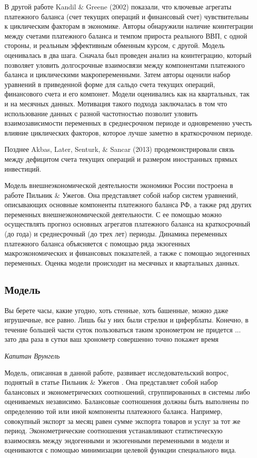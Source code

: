 \documentclass[a4paper, 14pt]{extarticle}
\begin{document}
В другой работе Kandil $\&$ Greene (2002) \autocite{kandil2002impact} показали, что ключевые агрегаты платежного баланса (счет текущих операций и финансовый счет) чувствительны к циклическим факторам в экономике. 
Авторы обнаружили наличие коинтеграции между счетами платежного баланса и темпом прироста реального ВВП, с одной стороны, и реальным эффективным обменным курсом, с другой. Модель оценивалась в два шага. 
Сначала был проведен анализ на коинтеграцию, который позволяет уловить долгосрочные взаимосвязи между компонентами платежного баланса и циклическими макропеременными. 
Затем авторы оценили набор уравнений в приведенной форме для сальдо счета текущих операций, финансового счета и его компонет. 
Модели оценивались как на квартальных, так и на месячных данных. 
Мотивация такого подхода заключалась в том что использование данных с разной частотностью позволит уловить взаимозависимости переменных в среднесрочном периоде и одновременно учесть влияние циклических факторов, которое лучше заметно в краткосрочном периоде.

Позднее Akbas, Later, Senturk, $\&$ Sancar  (2013) \autocite{akbas2013testing} продемонстрировали
 связь между дефицитом счета текущих операций и размером иностранных прямых инвестиций.

Модель внешнеэкономической деятельности экономики России построена в работе Пильник $\&$ Ужегов.
Она представляет собой набор систем уравнений, описывающих основные компоненты платежного баланса РФ, а также ряд других переменных внешнеэкономической деятельности.
С ее помощью можно осуществлять прогноз основных агрегатов платежного баланса на краткосрочный (до года) и среднесрочный (до трех лет) периоды.
Динамика переменных платежного баланса объясняется с помощью ряда экзогенных макроэкономических и финансовых показателей, а также с помощью эндогенных переменных. 
Оценка модели происходит на месячных и квартальных данных.


\newpage
\subsection{Модель}
\epigraph{Вы берете часы, какие угодно, хоть стенные, хоть башенные, можно даже игрушечные, все равно. Лишь бы у них были стрелки и циферблаты. Конечно, в течение большей части суток пользоваться таким хронометром не придется ... зато два раза в сутки ваш хронометр совершенно точно покажет время}{\textit{Капитан Врунгель}}
Модель, описанная в данной работе, развивает исследовательский вопрос, поднятый в статье Пильник $\&$ Ужегов \autocite{пильник2017модель}. 
Она представляет собой набор балансовых и эконометрических соотношений, сгруппированных в системы либо оцениваемых независимо. 
Балансовые соотношения должны быть выполнены по определению той или иной компоненты платежного баланса. 
Например, совокупный экспорт за месяц равен сумме экспорта товаров и услуг за тот же период.
Эконометрические соотношения устанавливают статистическую взаимосвязь между эндогенными и экзогенными переменными в модели и оцениваются с помощью минимизации целевой функции специального вида.
\end{document}

